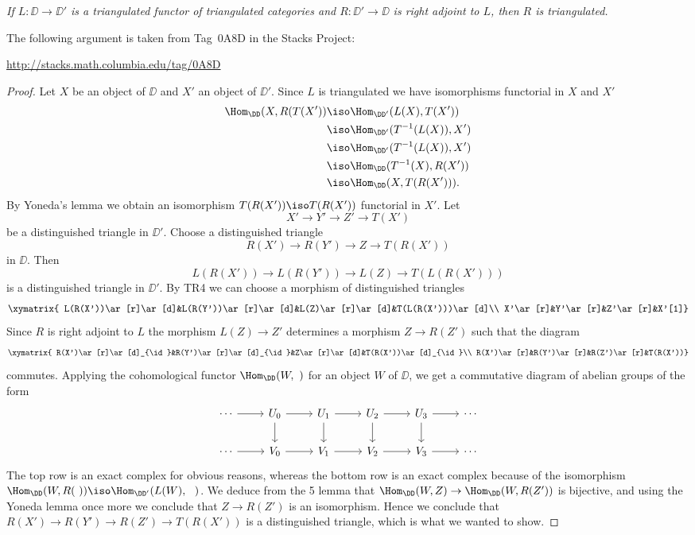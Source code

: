 \documentclass[12pt]{article}
\theoremstyle{remark}
\theoremstyle{definition}
\begin{document}
\nn\emph{If $L:\DD\to\DD'$ is a triangulated functor of triangulated categories and $R:\DD'\to\DD$ is right adjoint to $L$, then $R$ is triangulated.} 

The following argument is taken from Tag~0A8D in the Stacks Project:\bigskip

\centerline{\href{http://stacks.math.columbia.edu/tag/0A8D}{http://stacks.math.columbia.edu/tag/0A8D}}

\begin{proof}
Let $X$ be an object of $\DD$ and $X'$ an object of $\DD'$. Since $L$ is triangulated we have isomorphisms functorial in $X$ and $X'$
\begin{align*}
\Hom_\DD(X,R(T(X'))
&\iso\Hom_{\DD'}(L(X),T(X'))\\
&\iso\Hom_{\DD'}(T^{-1}(L(X)),X')\\
&\iso\Hom_{\DD'}(T^{-1}(L(X)),X')\\
&\iso\Hom_\DD(T^{-1}(X),R(X'))\\
&\iso\Hom_\DD(X,T(R(X'))).
\end{align*}
By Yoneda's lemma we obtain an isomorphism $T(R(X'))\iso T(R(X'))$ functorial in $X'$. Let $$X'\to Y'\to Z'\to T(X')$$ be a distinguished triangle in $\DD'$. Choose a distinguished triangle $$R(X')\to R(Y')\to Z\to T(R(X'))$$ in $\DD$. Then $$L(R(X'))\to L(R(Y'))\to L(Z)\to T(L(R(X')))$$ is a distinguished triangle in $\DD'$. By TR4 we can choose a morphism of distinguished triangles
$$
\xymatrix{
L(R(X'))\ar[r]\ar[d]&L(R(Y'))\ar[r]\ar[d]&L(Z)\ar[r]\ar[d]&T(L(R(X')))\ar[d]\\
X'\ar[r]&Y'\ar[r]&Z'\ar[r]&X'[1]}
$$
Since $R$ is right adjoint to $L$ the morphism $L(Z)\to Z'$ determines a morphism $Z \to R(Z')$ such that the diagram
$$
\xymatrix{
R(X')\ar[r]\ar[d]_{\id}&R(Y')\ar[r]\ar[d]_{\id}&Z\ar[r]\ar[d]&T(R(X'))\ar[d]_{\id}\\
R(X')\ar[r]&R(Y')\ar[r]&R(Z')\ar[r]&T(R(X'))}
$$
commutes. Applying the cohomological functor $\Hom_\DD(W,\ )$ for an object $W$ of $\DD$, we get a commutative diagram of abelian groups of the form 
$$
\begin{tikzcd}
\cdots\ar[r]&U_0\ar[d]\ar[r]&U_1\ar[d]\ar[r]&U_2\ar[d]\ar[r]&U_3\ar[d]\ar[r]&\cdots\\ 
\cdots\ar[r]&V_0\ar[r]&V_1\ar[r]&V_2\ar[r]&V_3\ar[r]&\cdots
\end{tikzcd}
$$ 
The top row is an exact complex for obvious reasons, whereas the bottom row is an exact complex because of the isomorphism $\Hom_\DD(W,R(\ ))\iso\Hom_{\DD'}(L(W),\ \ )$. We deduce from the 5 lemma that $\Hom_\DD(W,Z)\to\Hom_\DD(W,R(Z'))$ is bijective, and using the Yoneda lemma once more we conclude that $Z\to R(Z')$ is an isomorphism. Hence we conclude that $R(X')\to R(Y')\to R(Z')\to T(R(X'))$ is a distinguished triangle, which is what we wanted to show.
\end{proof}
\end{document}
